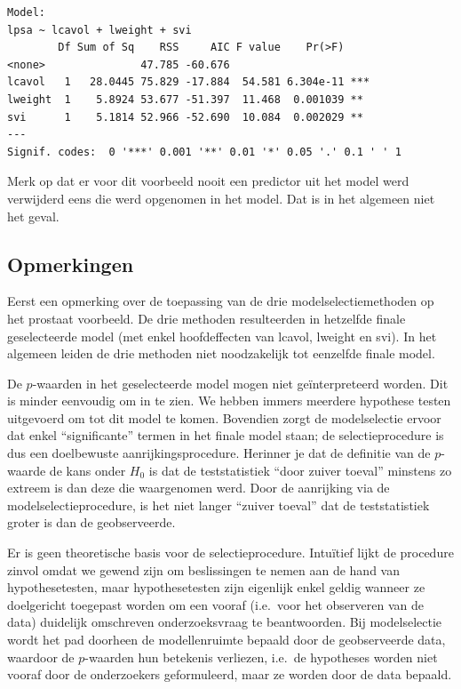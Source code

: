 \documentclass[
  dutch,
  letterpaper,
  12pt]{book}
\newcounter{none} %
\theoremstyle{definition}
\theoremstyle{definition}
\theoremstyle{definition}
\theoremstyle{remark}
\begin{document}
\begin{verbatim}
Model:
lpsa ~ lcavol + lweight + svi
        Df Sum of Sq    RSS     AIC F value    Pr(>F)    
<none>               47.785 -60.676                      
lcavol   1   28.0445 75.829 -17.884  54.581 6.304e-11 ***
lweight  1    5.8924 53.677 -51.397  11.468  0.001039 ** 
svi      1    5.1814 52.966 -52.690  10.084  0.002029 ** 
---
Signif. codes:  0 '***' 0.001 '**' 0.01 '*' 0.05 '.' 0.1 ' ' 1
\end{verbatim}

Merk op dat er voor dit voorbeeld nooit een predictor uit het model werd
verwijderd eens die werd opgenomen in het model. Dat is in het algemeen
niet het geval.

\subsection{Opmerkingen}\label{opmerkingen}

Eerst een opmerking over de toepassing van de drie modelselectiemethoden
op het prostaat voorbeeld. De drie methoden resulteerden in hetzelfde
finale geselecteerde model (met enkel hoofdeffecten van lcavol, lweight
en svi). In het algemeen leiden de drie methoden niet noodzakelijk tot
eenzelfde finale model.

De \(p\)-waarden in het geselecteerde model mogen niet geïnterpreteerd
worden. Dit is minder eenvoudig om in te zien. We hebben immers meerdere
hypothese testen uitgevoerd om tot dit model te komen. Bovendien zorgt
de modelselectie ervoor dat enkel ``significante'' termen in het finale
model staan; de selectieprocedure is dus een doelbewuste
aanrijkingsprocedure. Herinner je dat de definitie van de \(p\)-waarde
de kans onder \(H_0\) is dat de teststatistiek ``door zuiver toeval''
minstens zo extreem is dan deze die waargenomen werd. Door de aanrijking
via de modelselectieprocedure, is het niet langer ``zuiver toeval'' dat
de teststatistiek groter is dan de geobserveerde.

Er is geen theoretische basis voor de selectieprocedure. Intuïtief lijkt
de procedure zinvol omdat we gewend zijn om beslissingen te nemen aan de
hand van hypothesetesten, maar hypothesetesten zijn eigenlijk enkel
geldig wanneer ze doelgericht toegepast worden om een vooraf (i.e.~voor
het observeren van de data) duidelijk omschreven onderzoeksvraag te
beantwoorden. Bij modelselectie wordt het pad doorheen de modellenruimte
bepaald door de geobserveerde data, waardoor de \(p\)-waarden hun
betekenis verliezen, i.e.~de hypotheses worden niet vooraf door de
onderzoekers geformuleerd, maar ze worden door de data bepaald.
\end{document}
